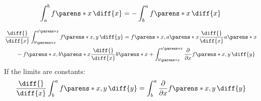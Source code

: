 \begin{multicols}{2}
\begin{CheatsheetEntryFrame}
        \begin{equation*}
            \int_a^b f\parens*{x} \,\diff{x}
            = - \int_b^a f\parens*{x} \,\diff{x}
        \end{equation*}

        \begin{align*}
            &\frac{\diff{}}{\diff{x}}
            \int_{b\parens*{x}}^{a\parens*{x}} f\parens*{x,y} \,\diff{y}
            = f \parens*{x, a\parens*{x}} \frac{\diff{}}{\diff{x}} a\parens*{x}
            \\
            &\qquad
            - f \parens*{x, b\parens*{x}} \frac{\diff{}}{\diff{x}} b\parens*{x}
            + \int_{b\parens*{x}}^{a\parens*{x}}{
                \frac{\partial{}}{\partial{x}} f\parens*{x,y} \,\diff{y}
            }
        \end{align*}
        If the limits are constants:
        \begin{gather*}
            \frac{\diff{}}{\diff{x}}
            \int_b^a f\parens*{x,y} \,\diff{y}
            = \int_b^a \frac{\partial{}}{\partial{x}} f\parens*{x,y} \,\diff{y}
        \end{gather*}

    \end{CheatsheetEntryFrame}

    \MulticolsCleanEnd

\end{multicols}

